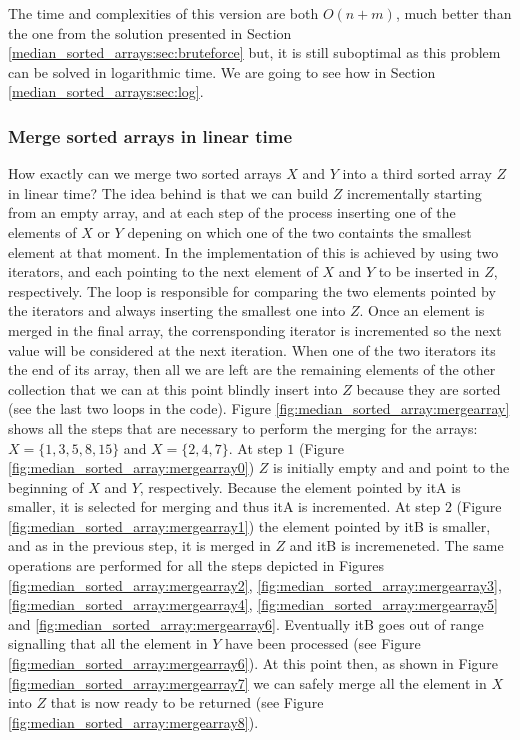 

The time and complexities of this version are both $O(n+m)$, much better than the one from the solution presented in
Section \ref{median_sorted_arrays:sec:bruteforce} but, it is still suboptimal as this problem can be
solved in logarithmic time. We are going to see how in Section \ref{median_sorted_arrays:sec:log}.

\subsubsection{Merge sorted arrays in linear time}
How exactly can we merge two sorted arrays $X$ and $Y$ into a third sorted array $Z$ in linear time? 
The idea behind is that we can build $Z$ incrementally starting from an empty array, and at each step of the process
inserting one of the elements of $X$ or $Y$ depening on which one of the two containts the smallest element at that moment.
In the implementation of  this is achieved by using two iterators,  and  
each pointing to the next element of $X$ and $Y$ to be inserted in $Z$, respectively.
The  loop is responsible for comparing the two elements pointed by the iterators and always inserting the smallest one
into $Z$.  Once an element is merged in the final array, the corrensponding iterator is incremented so the next value will be considered at the next iteration.
When one of the two iterators its the end of its array, then all we are left are the remaining elements of the other collection that we can at this point blindly insert into $Z$ because they are sorted 
(see the last two  loops in the code).
Figure \ref{fig:median_sorted_array:mergearray} shows all the steps that are necessary to perform the merging for the arrays:
$X = \{1,3,5,8,15\}$ and $X = \{2,4,7\}$. At step $1$ (Figure \ref{fig:median_sorted_array:mergearray0}) $Z$ is initially empty and  and  point to the beginning of $X$ and $Y$, respectively.
Because the element pointed by itA is smaller, it is selected for merging and thus itA is incremented.
At step $2$ (Figure \ref{fig:median_sorted_array:mergearray1}) the element pointed by itB is smaller, and as in the previous step, it is merged in $Z$ and itB is incremeneted.
The same operations are performed for all the steps depicted in Figures 
\ref{fig:median_sorted_array:mergearray2},
\ref{fig:median_sorted_array:mergearray3},
\ref{fig:median_sorted_array:mergearray4},
\ref{fig:median_sorted_array:mergearray5} and \ref{fig:median_sorted_array:mergearray6}.
Eventually itB goes out of range signalling that all the element in $Y$ have been processed (see Figure \ref{fig:median_sorted_array:mergearray6}).
At this point then, as shown in Figure \ref{fig:median_sorted_array:mergearray7} we can safely merge all the element in $X$ into $Z$ that is now ready to be returned (see Figure \ref{fig:median_sorted_array:mergearray8}).

